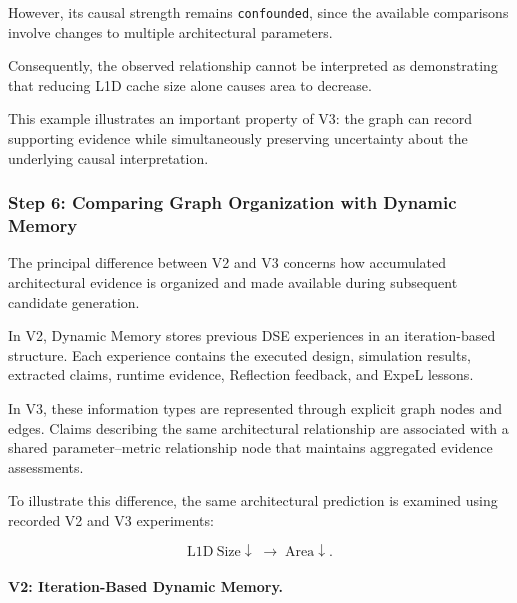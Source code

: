 However, its causal strength remains
\texttt{confounded}, since the available
comparisons involve changes to multiple
architectural parameters.

Consequently, the observed relationship
cannot be interpreted as demonstrating
that reducing L1D cache size alone
causes area to decrease.

This example illustrates an important
property of V3: the graph can record
supporting evidence while simultaneously
preserving uncertainty about the
underlying causal interpretation.




\subsubsection{Step 6: Comparing Graph Organization with Dynamic Memory}

The principal difference between V2 and V3
concerns how accumulated architectural
evidence is organized and made available
during subsequent candidate generation.

In V2, Dynamic Memory stores previous DSE
experiences in an iteration-based structure.
Each experience contains the executed design,
simulation results, extracted claims,
runtime evidence, Reflection feedback,
and ExpeL lessons.

In V3, these information types are represented
through explicit graph nodes and edges.
Claims describing the same architectural
relationship are associated with a shared
parameter--metric relationship node that
maintains aggregated evidence assessments.

To illustrate this difference, the same
architectural prediction is examined using
recorded V2 and V3 experiments:

\begin{equation}
\mathrm{L1D\ Size}\downarrow
\;\rightarrow\;
\mathrm{Area}\downarrow.
\end{equation}



\paragraph{V2: Iteration-Based Dynamic Memory.}

